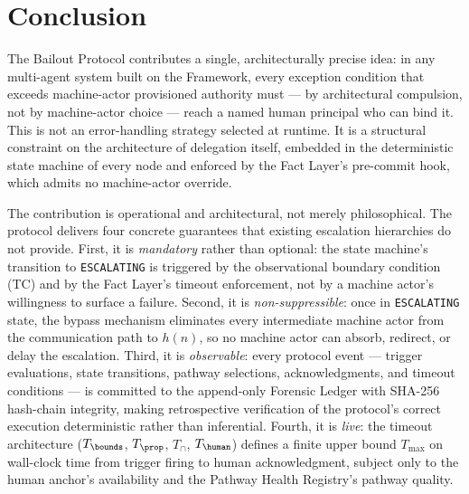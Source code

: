 \section{Conclusion}\label{sec:conclusion}

The Bailout Protocol contributes a single, architecturally precise idea: in any multi-agent system built on the \bxthree{} Framework, every exception condition that exceeds machine-actor provisioned authority must — by architectural compulsion, not by machine-actor choice — reach a named human principal who can bind it. This is not an error-handling strategy selected at runtime. It is a structural constraint on the architecture of delegation itself, embedded in the deterministic state machine of every \bxthree{} node and enforced by the Fact Layer's pre-commit hook, which admits no machine-actor override.

The contribution is operational and architectural, not merely philosophical. The protocol delivers four concrete guarantees that existing escalation hierarchies do not provide. First, it is \emph{mandatory} rather than optional: the state machine's transition to \texttt{ESCALATING} is triggered by the observational boundary condition (TC) and by the Fact Layer's timeout enforcement, not by a machine actor's willingness to surface a failure. Second, it is \emph{non-suppressible}: once in \texttt{ESCALATING} state, the bypass mechanism eliminates every intermediate machine actor from the communication path to $h(n)$, so no machine actor can absorb, redirect, or delay the escalation. Third, it is \emph{observable}: every protocol event — trigger evaluations, state transitions, pathway selections, acknowledgments, and timeout conditions — is committed to the append-only Forensic Ledger with SHA-256 hash-chain integrity, making retrospective verification of the protocol's correct execution deterministic rather than inferential. Fourth, it is \emph{live}: the timeout architecture ($T_{\bounds}$, $T_{\prop}$, $T_{\cap}$, $T_{\human}$) defines a finite upper bound $T_{\max}$ on wall-clock time from trigger firing to human acknowledgment, subject only to the human anchor's availability and the Pathway Health Registry's pathway quality.

